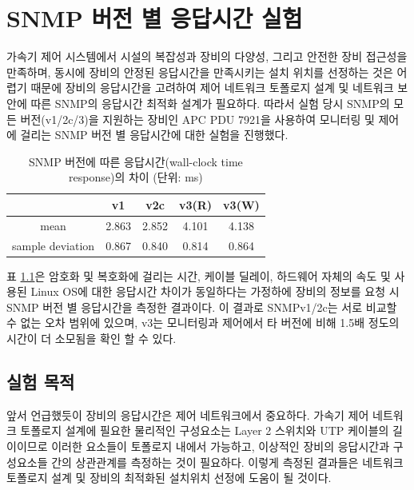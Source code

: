 \documentclass[11pt
  , a4paper
  , article
  , oneside
]{memoir}
\begin{document}
\clearpage

\chapter{SNMP 버전 별 응답시간 실험}
가속기 제어 시스템에서 시설의 복잡성과 장비의 다양성, 그리고 안전한 장비 접근성을 만족하며, 동시에 장비의 안정된 응답시간을 만족시키는 설치 위치를 선정하는 것은 어렵기 때문에 장비의 응답시간을 고려하여 제어 네트워크 토폴로지 설계 및 네트워크 보안에 따른 SNMP의 응답시간 최적화 설계가 필요하다. 따라서 실험 당시 SNMP의 모든 버전(v1/2c/3)을 지원하는 장비인 APC PDU 7921을 사용하여 모니터링 및 제어에 걸리는 SNMP 버전 별 응답시간에 대한 실험을 진행했다.

\begin{table}[h!]
\begin{center}
\begin{tabular}{c|c|c|c|c}\hline
 & v1 & v2c & v3(R) & v3(W) \\ \hline
mean & 2.863 & 2.852 & 4.101 & 4.138 \\ \hline
sample deviation & 0.867 & 0.840 & 0.814 & 0.864 \\ \hline
\end{tabular}
\caption{SNMP 버전에 따른 응답시간(wall-clock time response)의 차이 (단위: ms)}
  \label{table:test}  
\end{center}
\end{table}
표 \ref{table:test}은 암호화 및 복호화에 걸리는 시간, 케이블 딜레이, 하드웨어 자체의 속도 및 사용된 Linux OS에 대한 응답시간 차이가 동일하다는 가정하에 장비의 정보를 요청 시 SNMP 버전 별 응답시간을 측정한 결과이다. 이 결과로 SNMPv1/2c는 서로 비교할 수 없는 오차 범위에 있으며, v3는 모니터링과 제어에서 타 버전에 비해 1.5배 정도의 시간이 더 소모됨을 확인 할 수 있다.

\section{실험 목적}
앞서 언급했듯이 장비의 응답시간은 제어 네트워크에서 중요하다. 가속기 제어 네트워크 토폴로지 설계에 필요한 물리적인 구성요소는 Layer 2 스위치와 UTP 케이블의 길이이므로 이러한 요소들이 토폴로지 내에서 가능하고, 이상적인 장비의 응답시간과 구성요소들 간의 상관관계를 측정하는 것이 필요하다. 이렇게 측정된 결과들은 네트워크 토폴로지 설계 및 장비의 최적화된 설치위치 선정에 도움이 될 것이다.
\end{document}
